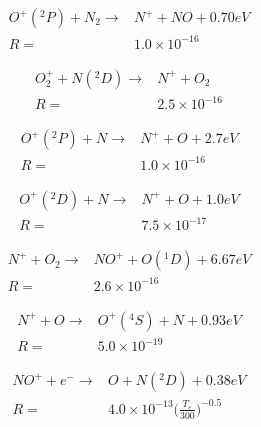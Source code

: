 \documentclass[twoside,10pt]{book}
\begin{document}
\begin{equation}
\begin{split}
O^+(^2P) + N_2 \rightarrow & N^+ + NO + 0.70 eV\\
R = & 1.0 \times 10^{-16}
\end{split}
\end{equation}

\begin{equation}
\begin{split}
O^+_2 + N(^2D) \rightarrow & N^+ + O_2 \\
R = & 2.5 \times 10^{-16}
\end{split}
\end{equation}

\begin{equation}
\begin{split}
O^+(^2P) + N \rightarrow & N^+ + O + 2.7 eV \\
R = & 1.0 \times 10^{-16}
\end{split}
\end{equation}

\begin{equation}
\begin{split}
O^+(^2D) + N \rightarrow & N^+ + O + 1.0 eV \\
R = & 7.5 \times 10^{-17}
\end{split}
\end{equation}

\begin{equation}
\begin{split}
N^+ + O_2 \rightarrow & NO^+ + O(^1D) + 6.67 eV \\
R = & 2.6 \times 10^{-16}
\end{split}
\end{equation}

\begin{equation}
\begin{split}
N^+ + O \rightarrow & O^+(^4S) + N + 0.93 eV \\
R = & 5.0 \times 10^{-19}
\end{split}
\end{equation}

\begin{equation}
\begin{split}
NO^+ + e^- \rightarrow & O + N(^2D) + 0.38 eV \\
R = & 4.0 \times 10^{-13} \bigg(\frac{T_e}{300}\bigg)^{-0.5} %
\end{split}
\end{equation}
\end{document}

